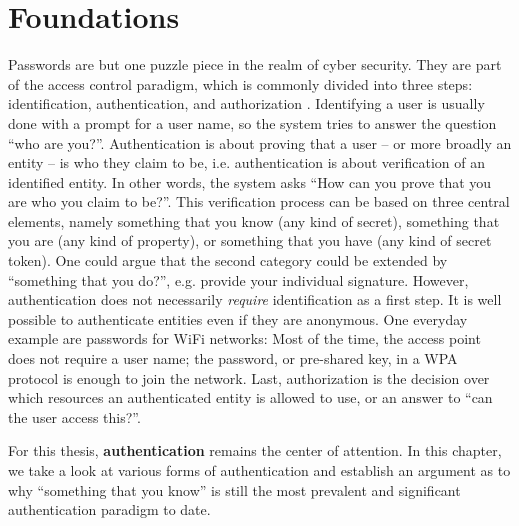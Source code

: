 \chapter[Foundations]{Foundations}\label{chap:rw:passwords}

Passwords are but one puzzle piece in the realm of cyber security. They are part of the access control paradigm, which is commonly divided into three steps: identification, authentication, and authorization \cite{Riley2006IdentityAuthenticationDistinct}. Identifying a user is usually done with a prompt for a user name, so the system tries to answer the question ``who are you?''. Authentication is about proving that a user -- or more broadly an entity -- is who they claim to be, i.e. authentication is about verification of an identified entity. In other words, the system asks ``How can you prove that you are who you claim to be?''. This verification process can be based on three central elements, namely something that you know (any kind of secret), something that you are (any kind of property), or something that you have (any kind of secret token). One could argue that the second category could be extended by ``something that you do?'', e.g. provide your individual signature. However, authentication does not necessarily \textit{require} identification as a first step. It is well possible to authenticate entities even if they are anonymous. One everyday example are passwords for WiFi networks: Most of the time, the access point does not require a user name; the password, or pre-shared key, in a \gls{WPA} protocol is enough to join the network. 
Last, authorization is the decision over which resources an authenticated entity is allowed to use, or an answer to ``can the user access this?''.


For this thesis, \textbf{authentication} remains the center of attention. In this chapter, we take a look at various forms of authentication and establish an argument as to why ``something that you know'' is still the most prevalent and significant authentication paradigm to date. 

